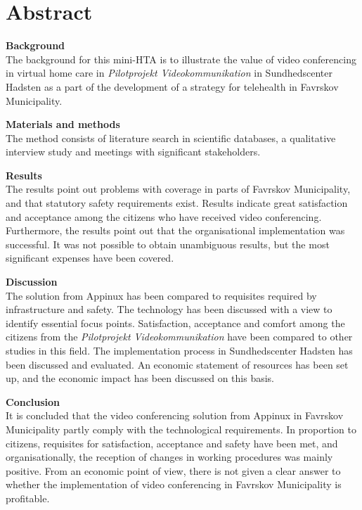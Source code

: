 \chapter{Abstract}

\textbf{Background}\\
The background for this mini-HTA is to illustrate the value of video conferencing in virtual home care in \textit{Pilotprojekt Videokommunikation} in Sundhedscenter Hadsten as a part of the development of a strategy for telehealth in Favrskov Municipality.

\textbf{Materials and methods}\\
The method consists of literature search in scientific databases, a qualitative interview study and meetings with significant stakeholders.

\textbf{Results}\\
The results point out problems with coverage in parts of Favrskov Municipality, and that statutory safety requirements exist. Results indicate great satisfaction and acceptance among the citizens who have received video conferencing. Furthermore, the results point out that the organisational implementation was successful. It was not possible to obtain unambiguous results, but the most significant expenses have been covered.

\textbf{Discussion}\\
The solution from Appinux has been compared to requisites required by infrastructure and safety. The technology has been discussed with a view to identify essential focus points. Satisfaction, acceptance and comfort among the citizens from the  \textit{Pilotprojekt Videokommunikation} have been compared to other studies in this field. The implementation process in Sundhedscenter Hadsten has been discussed and evaluated. An economic statement of resources has been set up, and the economic impact has been discussed on this basis.

\textbf{Conclusion}\\
It is concluded that the video conferencing solution from Appinux in Favrskov Municipality partly comply with the technological requirements. In proportion to citizens, requisites for satisfaction, acceptance and safety have been met, and organisationally, the reception of changes in working procedures was mainly positive. From an economic point of view, there is not given a clear answer to whether the implementation of video conferencing in Favrskov Municipality is profitable.